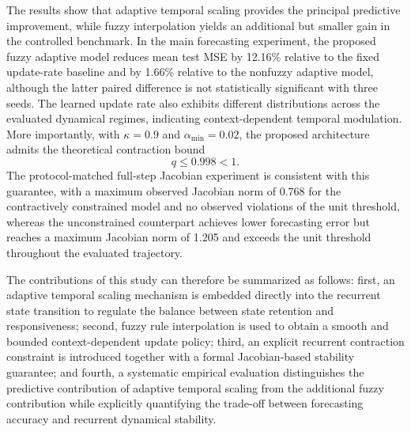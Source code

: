 \documentclass[journal]{IEEEtran}
\begin{document}
	The results show that adaptive temporal scaling provides the principal predictive improvement, while fuzzy interpolation yields an additional but smaller gain in the controlled benchmark. In the main forecasting experiment, the proposed fuzzy adaptive model reduces mean test MSE by 12.16\% relative to the fixed update-rate baseline and by 1.66\% relative to the nonfuzzy adaptive model, although the latter paired difference is not statistically significant with three seeds. The learned update rate also exhibits different distributions across the evaluated dynamical regimes, indicating context-dependent temporal modulation. More importantly, with $\kappa=0.9$ and $\alpha_{\min}=0.02$, the proposed architecture admits the theoretical contraction bound
	\begin{equation}
		q\leq0.998<1.
		\label{eq:intro_q}
	\end{equation}
	The protocol-matched full-step Jacobian experiment is consistent with this guarantee, with a maximum observed Jacobian norm of 0.768 for the contractively constrained model and no observed violations of the unit threshold, whereas the unconstrained counterpart achieves lower forecasting error but reaches a maximum Jacobian norm of 1.205 and exceeds the unit threshold throughout the evaluated trajectory.
	
	The contributions of this study can therefore be summarized as follows: first, an adaptive temporal scaling mechanism is embedded directly into the recurrent state transition to regulate the balance between state retention and responsiveness; second, fuzzy rule interpolation is used to obtain a smooth and bounded context-dependent update policy; third, an explicit recurrent contraction constraint is introduced together with a formal Jacobian-based stability guarantee; and fourth, a systematic empirical evaluation distinguishes the predictive contribution of adaptive temporal scaling from the additional fuzzy contribution while explicitly quantifying the trade-off between forecasting accuracy and recurrent dynamical stability.
	
	




\end{document}
